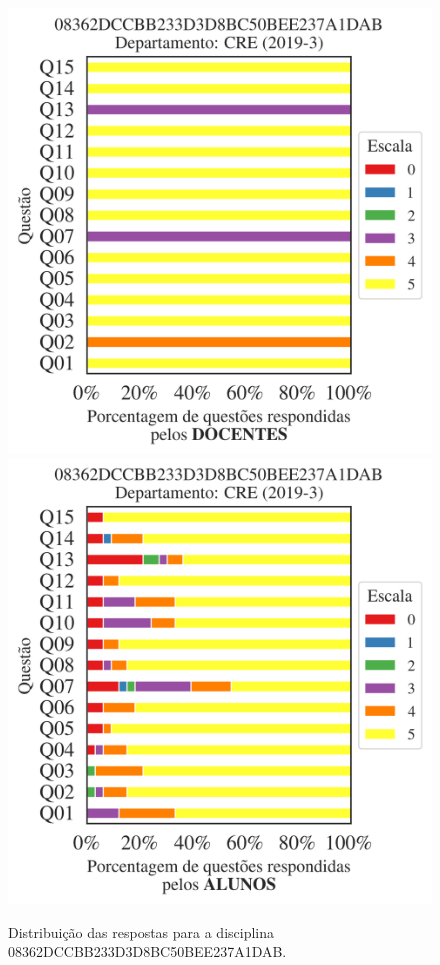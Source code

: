 \documentclass[a4paper,10pt]{article}
\begin{document}
\begin{figure}[h]
\centering
\includegraphics[width=0.485\linewidth]{analise_disciplina_departamento_CRE_08362DCCBB233D3D8BC50BEE237A1DAB_docentes.png}
\includegraphics[width=0.485\linewidth]{analise_disciplina_departamento_CRE_08362DCCBB233D3D8BC50BEE237A1DAB_alunos.png}
\caption{\label{fig:analise_geral_departamento}                Distribuição das respostas para a disciplina 08362DCCBB233D3D8BC50BEE237A1DAB. }
\end{figure}
\end{document}
